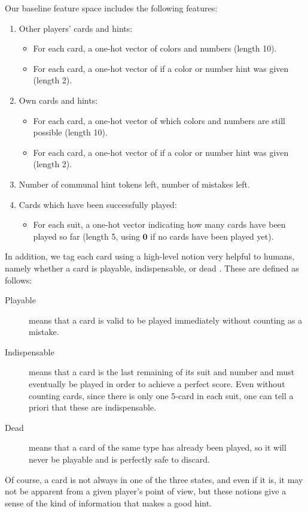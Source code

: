 \documentclass{article}
\begin{document}
Our baseline feature space includes the following features:
\begin{enumerate}
\item Other players' cards and hints:
  \begin{itemize}
  \item For each card, a one-hot vector of colors and numbers (length 10).
  \item For each card, a one-hot vector of if a color or number hint was given (length 2).
  \end{itemize}
\item Own cards and hints:
  \begin{itemize}
  \item For each card, a one-hot vector of which colors and numbers are still possible (length 10).
  \item For each card, a one-hot vector of if a color or number hint was given (length 2).
  \end{itemize}
\item Number of communal hint tokens left, number of mistakes left.
\item Cards which have been successfully played:
  \begin{itemize}
  \item For each suit, a one-hot vector indicating how many cards have been played so far (length 5, using $\mathbf{0}$ if no cards have been played yet).
  \end{itemize}
\end{enumerate}
In addition, we tag each card using a high-level notion very helpful to humans, namely whether a card is playable, indispensable, or dead \cite{cox15}. These are defined as follows:
\begin{description}
\item[Playable] means that a card is valid to be played immediately without counting as a mistake.
\item[Indispensable] means that a card is the last remaining of its suit and number and must eventually be played in order to achieve a perfect score. Even without counting cards, since there is only one 5-card in each suit, one can tell a priori that these are indispensable.
\item[Dead] means that a card of the same type has already been played, so it will never be playable and is perfectly safe to discard.
\end{description}
Of course, a card is not always in one of the three states, and even if it is, it may not be apparent from a given player's point of view, but these notions give a sense of the kind of information that makes a good hint.
\end{document}
